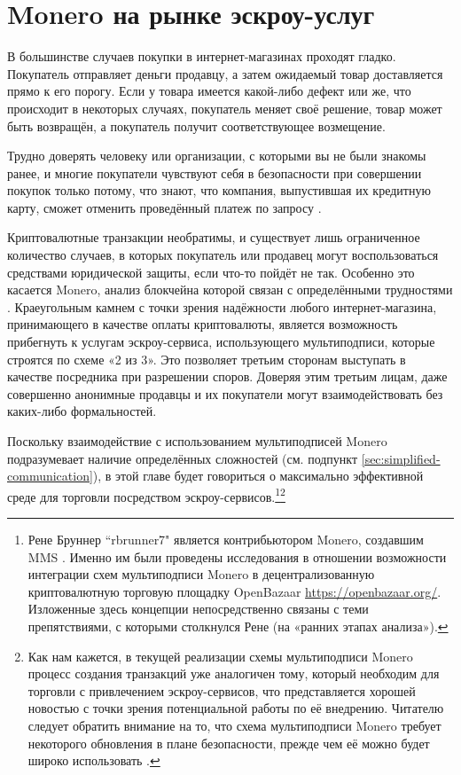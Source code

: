 \chapter{Monero на рынке эскроу-услуг}
\label{chapter:escrowed-market}

В большинстве случаев покупки в интернет-магазинах проходят гладко. Покупатель отправ\-ляет деньги продавцу, а затем ожидаемый товар доставляется прямо к его порогу. Если у товара имеется какой-либо дефект или же, что происходит в некоторых случаях, покупатель меняет своё решение, товар может быть возвращён, а покупатель получит соответствующее возмещение.

Трудно доверять человеку или организации, с которыми вы не были знакомы ранее, и многие покупатели чувствуют себя в безопасности при совершении покупок только потому, что знают, что компания, выпустившая их кредитную карту, сможет отменить проведённый платеж по запросу \cite{credit-card-reversals}.

Криптовалютные транзакции необратимы, и существует лишь ограниченное количество слу\-чаев, в которых покупатель или продавец могут воспользоваться средствами юридической защиты, если что-то пойдёт не так. Особенно это касается Monero, анализ блокчейна которой связан с определёнными трудностями \cite{chainalysis-2020-report}. Краеугольным камнем с точки зрения надёжности любого интернет-магазина, принимающего в качестве оплаты криптовалюты, является воз\-можность прибегнуть к услугам эскроу-сервиса, использующего мультиподписи, которые строятся по схеме «2 из 3». Это позволяет третьим сторонам выступать в качестве посредника при разрешении споров. Доверяя этим третьим лицам, даже совершенно анонимные продавцы и их покупатели могут взаимодействовать без каких-либо формальностей.

Поскольку взаимодействие с использованием мультиподписей Monero подразумевает наличие определённых сложностей (см. подпункт \ref{sec:simplified-communication}), в этой главе будет говориться о максимально эффективной среде для торговли посредством эскроу-сервисов.\footnote{Рене Бруннер ``rbrunner7" является контрибьютором Monero, создавшим MMS \cite{mms-project-proposal, mms-manual}. Именно им были проведены исследования в отношении возможности интеграции схем мультиподписи Monero в децентрализованную криптовалютную торговую площадку OpenBazaar \url{https://openbazaar.org/}. Изложенные здесь концепции непосредственно связаны с теми препятствиями, с которыми столкнулся Рене \cite{openbazaar-rbrunner-investigation} (на «ранних этапах анализа»).}\footnote{Как нам кажется, в текущей реализации схемы мультиподписи Monero процесс создания транзакций уже аналогичен тому, который необходим для торговли с привлечением эскроу-сервисов, что представляется хорошей новостью с точки зрения потенциальной работы по её внедрению. Читателю следует обратить внимание на то, что схема мультиподписи Monero требует некоторого обновления в плане безопасности, прежде чем её можно будет широко использовать \cite{multisig-research-issue-67}.}



